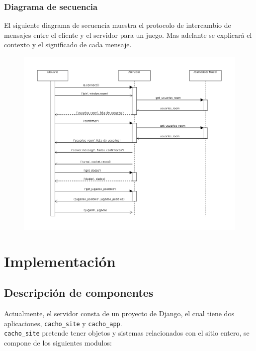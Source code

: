 \documentclass[a4paper,11pt]{article}
\begin{document}
\subsubsection{Diagrama de secuencia}
El siguiente diagrama de secuencia muestra el protocolo de intercambio de mensajes
entre el cliente y el servidor para un juego. Mas adelante se explicará el contexto
y el significado de cada mensaje.
\begin{figure}[h!]
	\centering
	\includegraphics[width=\textwidth]{seq_juego.png}
\end{figure}
\newpage
\section{Implementación}
\subsection{Descripción de componentes}
Actualmente, el servidor consta de un proyecto de Django, el cual tiene dos aplicaciones,
\texttt{cacho\_site} y \texttt{cacho\_app}.\\

\texttt{cacho\_site} pretende tener objetos y sistemas
relacionados con el sitio entero, se compone de los siguientes modulos:\\
\end{document}

